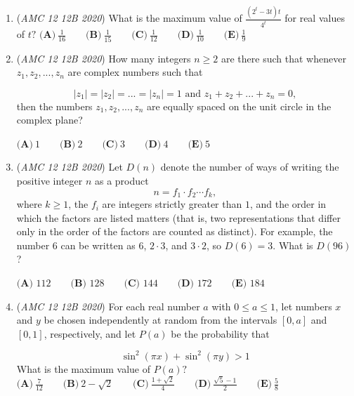 \begin{enumerate}
	\item (\textit{AMC 12 12B 2020}) What is the maximum value of $\frac{(2^t-3t)t}{4^t}$ for real values of $t?$
$\textbf{(A)}\ \frac{1}{16} \qquad\textbf{(B)}\ \frac{1}{15} \qquad\textbf{(C)}\ \frac{1}{12} \qquad\textbf{(D)}\ \frac{1}{10} \qquad\textbf{(E)}\ \frac{1}{9}$


	\item (\textit{AMC 12 12B 2020}) How many integers $n \geq 2$ are there such that whenever $z_1, z_2, ..., z_n$ are complex numbers such that


 
 \[|z_1| = |z_2| = ... = |z_n| = 1 \text{    and    } z_1 + z_2 + ... + z_n = 0,\]
then the numbers $z_1, z_2, ..., z_n$ are equally spaced on the unit circle in the complex plane?


 $\textbf{(A)}\ 1 \qquad\textbf{(B)}\ 2 \qquad\textbf{(C)}\ 3 \qquad\textbf{(D)}\ 4 \qquad\textbf{(E)}\ 5$


	\item (\textit{AMC 12 12B 2020}) Let $D(n)$ denote the number of ways of writing the positive integer $n$ as a product
 \[n = f_1\cdot f_2\cdots f_k,\]where $k\ge1$, the $f_i$ are integers strictly greater than $1$, and the order in which the factors are listed matters (that is, two representations that differ only in the order of the factors are counted as distinct). For example, the number $6$ can be written as $6$, $2\cdot 3$, and $3\cdot2$, so $D(6) = 3$. What is $D(96)$?


 $\textbf{(A) } 112 \qquad\textbf{(B) } 128 \qquad\textbf{(C) } 144 \qquad\textbf{(D) } 172 \qquad\textbf{(E) } 184$


	\item (\textit{AMC 12 12B 2020}) For each real number $a$ with $0 \leq a \leq 1$, let numbers $x$ and $y$ be chosen independently at random from the intervals $[0, a]$ and $[0, 1]$, respectively, and let $P(a)$ be the probability that


 
 \[\sin^2{(\pi x)} + \sin^2{(\pi y)} > 1\]
What is the maximum value of $P(a)?$
$\textbf{(A)}\ \frac{7}{12} \qquad\textbf{(B)}\ 2 - \sqrt{2} \qquad\textbf{(C)}\ \frac{1+\sqrt{2}}{4} \qquad\textbf{(D)}\ \frac{\sqrt{5}-1}{2} \qquad\textbf{(E)}\ \frac{5}{8}$


\end{enumerate}